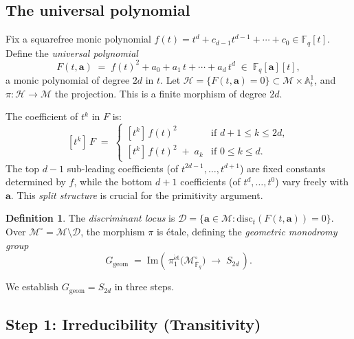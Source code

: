 \documentclass[11pt, a4paper]{article}
\theoremstyle{definition}
\newtheorem{definition}[theorem]{Definition}
\theoremstyle{remark}
\newcommand{\Fq}{\mathbb{F}_q}
\newcommand{\Fqbar}{\overline{\mathbb{F}}_q}
\newcommand{\Affine}{\mathbb{A}}
\newcommand{\disc}{\mathrm{disc}}
\begin{document}
\subsection{The universal polynomial}\label{subsec:universal}

Fix a squarefree monic polynomial
$f(t) = t^d + c_{d-1}t^{d-1} + \cdots + c_0 \in \Fq[t]$.
Define the \emph{universal polynomial}
\begin{equation}\label{eq:universal}
    F(t,\mathbf{a})
    \;=\;
    f(t)^2 + a_0 + a_1\,t + \cdots + a_d\,t^d
    \;\in\; \Fq[\mathbf{a}][t],
\end{equation}
a monic polynomial of degree $2d$ in $t$.
Let $\mathcal{H} = \{F(t,\mathbf{a})=0\}
\subset \mathcal{M} \times \Affine^1_t$,
and $\pi: \mathcal{H} \to \mathcal{M}$ the projection.
This is a finite morphism of degree $2d$.

The coefficient of $t^k$ in $F$ is:
\begin{equation}\label{eq:coefficients}
    [t^k]\, F \;=\;
    \begin{cases}
    [t^k]\, f(t)^2 & \text{if } d+1 \le k \le 2d, \\[3pt]
    [t^k]\, f(t)^2 \;+\; a_k & \text{if } 0 \le k \le d.
    \end{cases}
\end{equation}
The top $d-1$ sub-leading coefficients
(of $t^{2d-1}, \ldots, t^{d+1}$) are fixed constants
determined by $f$, while the bottom $d+1$ coefficients
(of $t^d, \ldots, t^0$) vary freely with $\mathbf{a}$.
This \emph{split structure} is crucial for the primitivity argument.

\begin{definition}\label{def:disc_locus}
The \emph{discriminant locus} is
$\mathcal{D}
= \{\mathbf{a} \in \mathcal{M} :
\disc_t(F(t,\mathbf{a})) = 0\}$.
Over $\mathcal{M}^\circ = \mathcal{M} \setminus \mathcal{D}$,
the morphism $\pi$ is \'etale, defining the
\emph{geometric monodromy group}
\[
    G_{\mathrm{geom}}
    \;=\;
    \mathrm{Im}\!\left(\,
    \pi_1^{\mathrm{\acute{e}t}}
    \bigl(\mathcal{M}^\circ_{\Fqbar}\bigr)
    \;\to\; S_{2d}
    \,\right).
\]
\end{definition}

We establish $G_{\mathrm{geom}} = S_{2d}$ in three steps.

\subsection{Step 1: Irreducibility (Transitivity)}
\label{subsec:irred}
\end{document}
